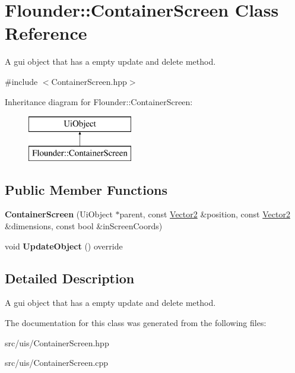 \hypertarget{class_flounder_1_1_container_screen}{}\section{Flounder\+:\+:Container\+Screen Class Reference}
\label{class_flounder_1_1_container_screen}


A gui object that has a empty update and delete method.  




{\ttfamily \#include $<$Container\+Screen.\+hpp$>$}

Inheritance diagram for Flounder\+:\+:Container\+Screen\+:\begin{figure}[H]
\begin{center}
\leavevmode
\includegraphics[height=2.000000cm]{class_flounder_1_1_container_screen}
\end{center}
\end{figure}
\subsection*{Public Member Functions}
\begin{DoxyCompactItemize}
\item 
\mbox{\label{class_flounder_1_1_container_screen_a508521e091aa722ab5240a85c543c545}} 
{\bfseries Container\+Screen} (Ui\+Object $\ast$parent, const \hyperlink{class_flounder_1_1_vector2}{Vector2} \&position, const \hyperlink{class_flounder_1_1_vector2}{Vector2} \&dimensions, const bool \&in\+Screen\+Coords)
\item 
\mbox{\label{class_flounder_1_1_container_screen_acceb19c85021ea5b65234f5f56c58fe7}} 
void {\bfseries Update\+Object} () override
\end{DoxyCompactItemize}


\subsection{Detailed Description}
A gui object that has a empty update and delete method. 



The documentation for this class was generated from the following files\+:\begin{DoxyCompactItemize}
\item 
src/uis/Container\+Screen.\+hpp\item 
src/uis/Container\+Screen.\+cpp\end{DoxyCompactItemize}
